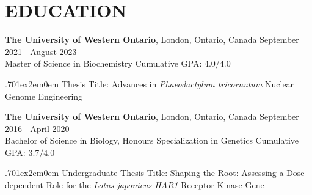 \documentclass[a4paper,9pt]{extarticle}
\begin{document}
\section*{EDUCATION}
\noindent
\begin{minipage}{1\textwidth}
\textbf{The University of Western Ontario}, London, Ontario, Canada \hfill September 2021 | August 2023\\ 
Master of Science in Biochemistry \hfill Cumulative GPA: 4.0/4.0 \par %
{\hsize.70\linewidth\parskip1ex\hangindent2em\parindent0em 
	\setlength{\parskip}{0pt} %
Thesis Title: Advances in \textit{Phaeodactylum tricornutum} Nuclear Genome Engineering\par}
\end{minipage}
\vspace{\parskip}


\noindent
\begin{minipage}{1\textwidth}
\textbf{The University of Western Ontario}, London, Ontario, Canada \hfill September 2016 | April 2020\\ 
Bachelor of Science in Biology, Honours Specialization in Genetics \hfill Cumulative GPA: 3.7/4.0 \par %
{\hsize.70\linewidth\parskip1ex\hangindent2em\parindent0em 
	\setlength{\parskip}{0pt} %
Undergraduate Thesis Title: Shaping the Root: Assessing a Dose-dependent Role for the \textit{Lotus japonicus HAR1} Receptor Kinase Gene \par}
\end{minipage}
\end{document}
